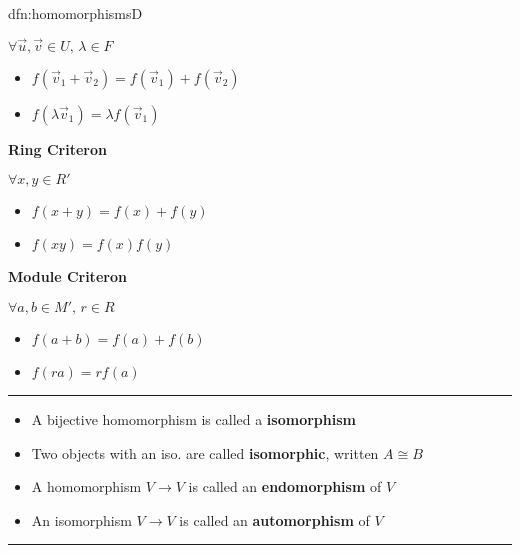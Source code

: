 \documentclass[landscape, 8pt]{extarticle}
\begin{document}
\begin{multicols}{3}
\begin{dfn}{dfn:homomorphisms}{D}
\begin{multicols}{3}
        $\forall\vec{u}, \vec{v}\in U,\,\lambda\in F$
        \begin{itemize}[leftmargin=*]
            \item $f(\vec{v}_{1} + \vec{v}_{2}) = f(\vec{v}_{1}) + f(\vec{v}_{2})$
            \item $f(\lambda \vec{v}_{1}) = \lambda f(\vec{v}_{1})$
        \end{itemize}
        
        \columnbreak    

        \textbf{Ring Criteron}

        $\forall x, y\in R'$
        \begin{itemize}[leftmargin=*]
            \item $f (x + y) = f(x) + f(y)$
            \item $f(xy) = f(x)f(y)$
        \end{itemize}

        \columnbreak

        \textbf{Module Criteron}

        $\forall a, b\in M',\,r\in R$
        \begin{itemize}[leftmargin=*]
            \item $f(a + b) = f(a) + f(b)$
            \item $f(ra) = rf(a)$
        \end{itemize}
    \end{multicols}
    \setlength{\columnseprule}{0pt}
    \vspace{-15pt}

    \noindent\rule{\textwidth}{0.2pt}
    \vspace{-12pt}

    \begin{itemize}[leftmargin=*]
        \setlength\itemsep{0em}
        \item A bijective homomorphism is called a \textbf{isomorphism}
        \item Two objects with an iso. are called \textbf{isomorphic}, written $A \cong B$
        \item A homomorphism $V\to V$ is called an \textbf{endomorphism} of $V$
        \item An isomorphism $V\to V$ is called an \textbf{automorphism} of $V$
    \end{itemize}

    \vspace{-10pt}
    \noindent\rule{\textwidth}{0.2pt}


\end{dfn}
\end{multicols}
\end{document}
